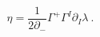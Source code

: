 \begin{equation}
\eta = \frac{1}{2 \partial_-} \Gamma^+ \Gamma^I \partial_I \lambda ~.
\end{equation}

